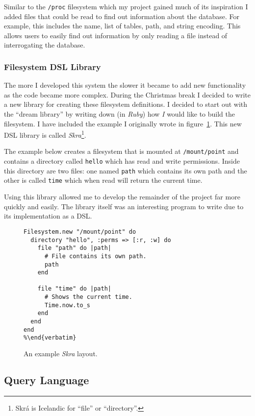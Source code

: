 Similar to the \texttt{/proc} filesystem which my project gained much of its
inspiration I added files that could be read to find out information about the
database. For example, this includes the name, list of tables, path, and string
encoding. This allows users to easily find out information by only reading
a file instead of interrogating the database.

\subsubsection{Filesystem DSL Library}

The more I developed this system the slower it became to add new functionality
as the code became more complex. During the Christmas break I decided to write
a new library for creating these filesystem definitions. I decided to start out
with the ``dream library'' by writing down (in \emph{Ruby}) how \emph{I} would
like to build the filesystem. I have included the example I originally wrote in
figure~\ref{fig:skra}. This new \ac{DSL} library is called
\emph{Skra}\footnote{Skr\'{a} is Icelandic for ``file'' or ``directory''.}.

The example below creates a filesystem that is mounted at \texttt{/mount/point}
and contains a directory called \texttt{hello} which has read and write
permissions. Inside this directory are two files: one named \texttt{path} which
contains its own path and the other is called \texttt{time} which when read
will return the current time.

Using this library allowed me to develop the remainder of the project far more
quickly and easily. The library itself was an interesting program to write due
to its implementation as a DSL.

\begin{figure}
\begin{lstlisting}
Filesystem.new "/mount/point" do
  directory "hello", :perms => [:r, :w] do
    file "path" do |path|
      # File contains its own path.
      path
    end

    file "time" do |path|
      # Shows the current time.
      Time.now.to_s
    end
  end
end
%\end{verbatim}
\end{lstlisting}
  \caption{An example \emph{Skra} layout.}
  \label{fig:skra}
\end{figure}

\subsection{Query Language}


